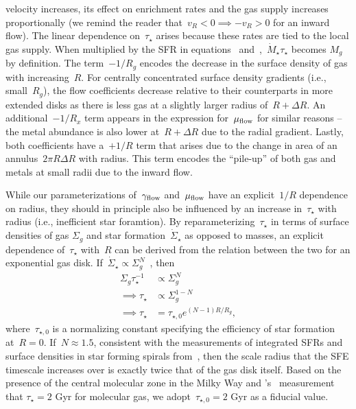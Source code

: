 velocity increases, its effect on enrichment rates and the gas supply increases
proportionally (we remind the reader that~$v_R < 0 \implies -v_R > 0$ for an
inward flow).
The linear dependence on~$\tau_\star$ arises because these rates are tied to
the local gas supply.
When multiplied by the SFR in equations~
and~,~$\dot{M}_\star \tau_\star$ becomes
$M_g$ by definition.
The term~$-1 / R_g$ encodes the decrease in the surface density of gas with
increasing~$R$.
For centrally concentrated surface density gradients (i.e., small~$R_g$),
the flow coefficients decrease relative to their counterparts in more extended
disks as there is less gas at a slightly larger radius of~$R + \Delta R$.
An additional~$-1 / R_x$ term appears in the expression for~$\mu_{\text{flow}}$ for
similar reasons -- the metal abundance is also lower at~$R + \Delta R$ due to
the radial gradient.
Lastly, both coefficients have a~$+1 / R$ term that arises due to the change in
area of an annulus~$2 \pi R \Delta R$ with radius.
This term encodes the ``pile-up'' of both gas and metals at small radii due to
the inward flow.
\par
While our parameterizations of~$\gamma_{\text{flow}}$ and~$\mu_{\text{flow}}$ have an
explicit~$1 / R$ dependence on radius, they should in principle also be
influenced by an increase in~$\tau_\star$ with radius (i.e., inefficient star
foramtion).
By reparameterizing~$\tau_\star$ in terms of surface densities of gas
$\Sigma_g$ and star formation~$\dot{\Sigma}_\star$ as opposed to masses, an
explicit dependence of~$\tau_\star$ with~$R$ can be derived from the relation
between the two for an exponential gas disk.
If~$\dot{\Sigma}_\star \propto \Sigma_g^N$~\citep[e.g.,][]{delosReyes2019,
Kennicutt2021}, then
\begin{equation}\begin{split}
\Sigma_g \tau_\star^{-1} &\propto \Sigma_g^N
\\
\implies \tau_\star &\propto \Sigma_g^{1 - N}
\\
\implies \tau_\star &= \tau_{\star,0} e^{(N - 1) R / R_g},
\end{split}\end{equation}
where~$\tau_{\star,0}$ is a normalizing constant specifying the efficiency of
star formation at~$R = 0$.
If~$N \approx 1.5$, consistent with the measurements of integrated SFRs and
surface densities in star forming spirals from~\citet{Kennicutt1998}, then
the scale radius that the SFE timescale increases over is exactly twice that
of the gas disk itself.
Based on the presence of the central molecular zone in the Milky Way
\citep[e.g.,][]{Morris1996, Dahmen1998, PiercePrice2000, Hatchfield2020} and
\citeauthor{Leroy2008}'s~\citeyearpar{Leroy2008} measurement that
$\tau_\star = 2$ Gyr for molecular gas, we adopt~$\tau_{\star,0} = 2$ Gyr as a
fiducial value.

